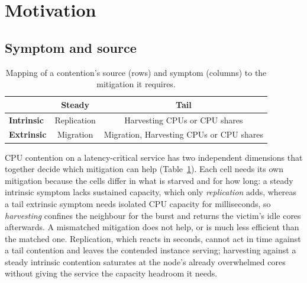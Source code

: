 
\newcommand{\hc}{HC\xspace}

\section{Motivation}
\label{sec:motivation}

\subsection{Symptom and source}
\label{sec:motiv-problem}

\begin{table}[t]
  \centering
  \small
  \begin{tabular}{l|cc}
    \toprule
    & \textbf{Steady} & \textbf{Tail} \\
    \midrule
    \textbf{Intrinsic} & Replication & Harvesting CPUs or CPU shares \\
    \textbf{Extrinsic} & Migration & Migration, Harvesting CPUs or CPU shares \\
    \bottomrule
  \end{tabular}
  \caption{Mapping of a contention's source (rows) and symptom (columns) to the mitigation it requires.}
  \label{tab:grid}
\end{table}

CPU contention on a latency-critical service has two independent dimensions
that together decide which mitigation can help (Table~\ref{tab:grid}).
Each cell needs its own mitigation because the cells differ in what is
starved and for how long: a steady intrinsic symptom lacks sustained
capacity, which only \emph{replication} adds, whereas a tail extrinsic
symptom needs isolated CPU capacity for milliseconds, so \emph{harvesting}
confines the neighbour for the burst and returns the victim's idle cores
afterwards. A mismatched mitigation does not help, or is much less
efficient than the matched one. Replication, which reacts in seconds,
cannot act in time against a tail contention and leaves the contended
instance serving; harvesting against a steady intrinsic contention
saturates at the node's already overwhelmed cores without giving the
service the capacity headroom it needs.

